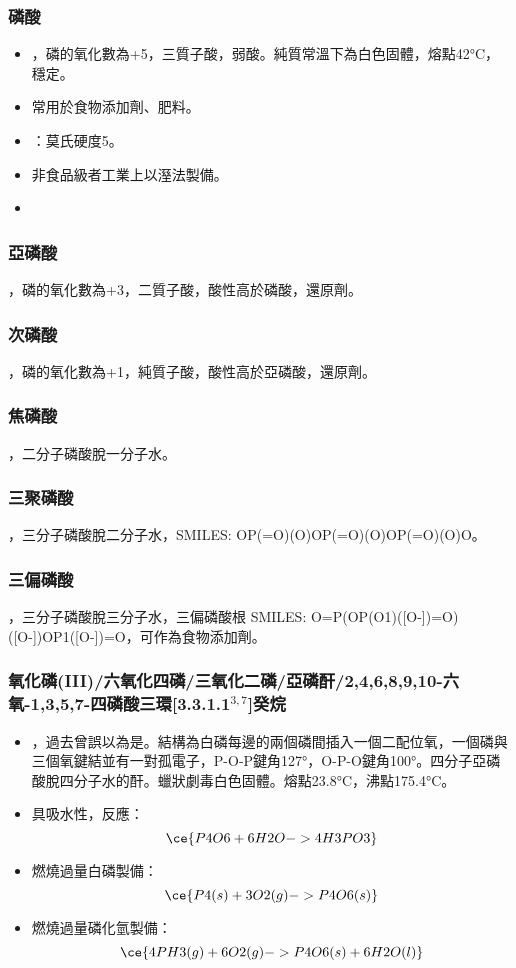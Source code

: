 \documentclass[a4paper,12pt]{report}
\begin{document}
\subsubsection{磷酸}
\begin{itemize}
\item {}，磷的氧化數為+5，三質子酸，弱酸。純質常溫下為白色固體，熔點42°C，穩定。
\item 常用於食物添加劑、肥料。
\item {}：莫氏硬度5。
\item 非食品級者工業上以溼法製備。
\item 
\end{itemize}
\subsubsection{亞磷酸}
，磷的氧化數為+3，二質子酸，酸性高於磷酸，還原劑。
\subsubsection{次磷酸}
，磷的氧化數為+1，純質子酸，酸性高於亞磷酸，還原劑。
\subsubsection{焦磷酸}
，二分子磷酸脫一分子水。
\subsubsection{三聚磷酸}
，三分子磷酸脫二分子水，SMILES: OP(=O)(O)OP(=O)(O)OP(=O)(O)O。
\subsubsection{三偏磷酸}
，三分子磷酸脫三分子水，三偏磷酸根 SMILES: O=P(OP(O1)([O-])=O)([O-])OP1([O-])=O，可作為食物添加劑。
\subsubsection{氧化磷(III)/六氧化四磷/三氧化二磷/亞磷酐/2,4,6,8,9,10-六氧-1,3,5,7-四磷酸三環[3.3.1.1$^{3,7}$]癸烷}
\begin{itemize}
\item {}，過去曾誤以為是。結構為白磷每邊的兩個磷間插入一個二配位氧，一個磷與三個氧鍵結並有一對孤電子，P-O-P鍵角127°，O-P-O鍵角100°。四分子亞磷酸脫四分子水的酐。蠟狀劇毒白色固體。熔點23.8°C，沸點175.4°C。
\item 具吸水性，反應：
\[\ce{P4O6 + 6H2O -> 4H3PO3}\]
\item 燃燒過量白磷製備：
\[\ce{P4(s) + 3O2(g) -> P4O6(s)}\]
\item 燃燒過量磷化氫製備：
\[\ce{4PH3(g) + 6O2(g) -> P4O6(s) + 6H2O(l)}\]
\end{itemize}
\end{document}
